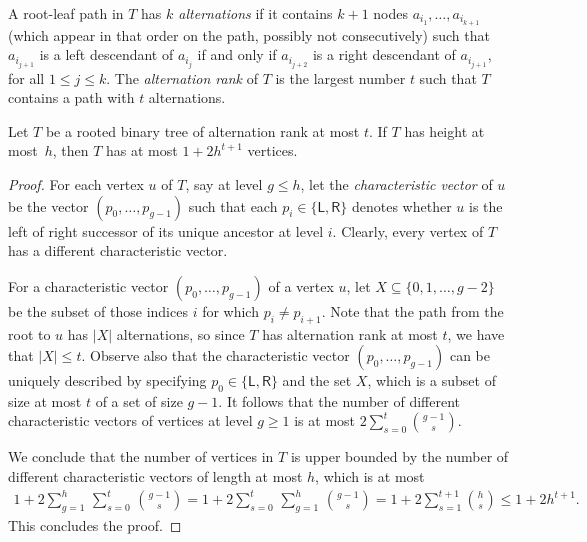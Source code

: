 A root-leaf path in $T$ has \emph{$k$ alternations} 
if it contains $k+1$ nodes $a_{i_1},\ldots, a_{i_{k+1}}$ (which appear
in that order on the path, possibly not consecutively) such that $a_{i_{j+1}}$ is a left descendant of $a_{i_j}$
if and only if $a_{i_{j+2}}$ is a right descendant of $a_{i_{j+1}}$, for all $1\leq j\leq k$. 
The \emph{alternation rank} of $T$ is the largest number $t$ such that 
$T$ contains a path with $t$ alternations.

\begin{lemma}\label{lem:number-of-nodes}
Let $T$ be a rooted binary tree of alternation rank at most $t$. If
$T$ has height at most~$h$, then $T$ has at most $1+2h^{t+1}$
vertices. 
\end{lemma}
\begin{proof}
For each vertex $u$ of $T$, say at level $g\leq h$, let the {\em{characteristic vector}} of $u$ be the vector $(p_0,\ldots,p_{g-1})$ such that each $p_i\in \{\mathsf{L},\mathsf{R}\}$ denotes
whether $u$ is the left of right successor of its unique ancestor at level $i$. Clearly, every vertex of $T$ has a different characteristic vector.

For a characteristic vector $(p_0,\ldots,p_{g-1})$ of a vertex $u$, let $X\subseteq \{0,1,\ldots,g-2\}$ be the subset of those indices $i$ for which $p_i\neq p_{i+1}$. 
Note that the path from the root to $u$ has $|X|$ alternations, so since $T$ has alternation rank at most $t$, we have that $|X|\leq t$.
Observe also that the characteristic vector $(p_0,\ldots,p_{g-1})$ can be uniquely described by specifying $p_0\in \{\mathsf{L},\mathsf{R}\}$ and the set $X$, which is a subset of size at most $t$ of
a set of size $g-1$.
It follows that the number of different characteristic vectors of vertices at level $g\geq 1$ is at most $2\sum_{s=0}^{t}\binom{g-1}{s}$.

We conclude that the number of vertices in $T$ is upper bounded by the number of different characteristic vectors of length at most $h$, which is at most
\begin{align*}
1+2\sum_{g=1}^h\, \sum_{s=0}^t\, \binom{g-1}{s}=1+2\sum_{s=0}^t\, \sum_{g=1}^h\, \binom{g-1}{s}= 1+2\sum_{s=1}^{t+1} \binom{h}{s}\leq 1+2h^{t+1}.
\end{align*}
This concludes the proof.
\end{proof}



